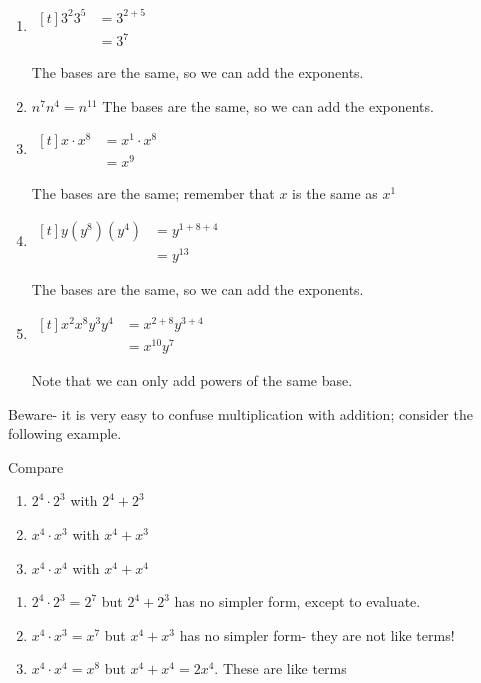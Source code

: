 \begin{myProof}
	\begin{enumerate}
		\item 
		$\begin{aligned}[t]
		3^2 3^5&=3^{2+5}\\
		&=3^7
		\end{aligned}$ 
		
		The bases are the same, so we can add the exponents.
		\item $n^7 n^4=n^{11}$ The bases are the same, so we can add the exponents.
		\item 
		$\begin{aligned}[t]
		x \cdot x^8&=x^1\cdot x^8\\
		& = x^9
		\end{aligned}$ 
		
		The bases are the same; remember that $x$ is the same as $x^1$
		\item 
		$\begin{aligned}[t]
		y(y^8)(y^4)&=y^{1+8+4}\\
		&=y^{13}
		\end{aligned}$
		
		The bases are the same, so we can add the exponents.
		\item 
		$\begin{aligned}[t]
		x^2 x^8 y^3 y^4&=x^{2+8}y^{3+4}\\
		&=x^{10}y^7
		\end{aligned}$
		
		Note that we can only add powers of the same base.
	\end{enumerate} 
	\mbox{}
\end{myProof} 
Beware- it is very easy to  confuse multiplication with addition; consider the following example.
\begin{myexample}
Compare 
\begin{enumerate}
	\item $2^4\cdot 2^3$ with $2^4 + 2^3$
	\item $x^4 \cdot x^3$ with $x^4+x^3$
	\item $x^4 \cdot x^4$ with $x^4+x^4$
\end{enumerate} 
{}
\end{myexample}
\begin{myProof}
	\begin{enumerate}
		\item $2^4\cdot  2^3=2^7$ but $2^4 + 2^3$ has no simpler form, except to evaluate.
		\item $x^4 \cdot  x^3=x^7$ but $x^4+x^3$ has no simpler form- they are not like terms!
		\item $x^4 \cdot  x^4=x^8$ but $x^4+x^4=2x^4$. These are like terms
	\end{enumerate} 
\end{myProof} 

